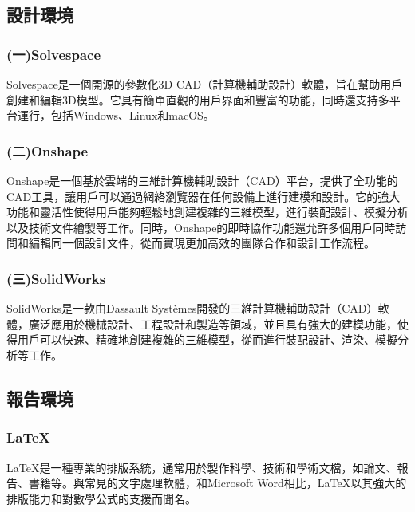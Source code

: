 \subsection{設計環境}
\subsubsection{(一)Solvespace}
\fontsize{14pt}{2.5pt}\sectionef\hspace{12pt}
Solvespace是一個開源的參數化3D CAD（計算機輔助設計）軟體，旨在幫助用戶創建和編輯3D模型。它具有簡單直觀的用戶界面和豐富的功能，同時還支持多平台運行，包括Windows、Linux和macOS。\\
\subsubsection{(二)Onshape}
\fontsize{14pt}{2.5pt}\sectionef\hspace{12pt}
Onshape是一個基於雲端的三維計算機輔助設計（CAD）平台，提供了全功能的CAD工具，讓用戶可以通過網絡瀏覽器在任何設備上進行建模和設計。它的強大功能和靈活性使得用戶能夠輕鬆地創建複雜的三維模型，進行裝配設計、模擬分析以及技術文件繪製等工作。同時，Onshape的即時協作功能還允許多個用戶同時訪問和編輯同一個設計文件，從而實現更加高效的團隊合作和設計工作流程。\\
\subsubsection{(三)SolidWorks}
\fontsize{14pt}{2.5pt}\sectionef\hspace{12pt}
SolidWorks是一款由Dassault Systèmes開發的三維計算機輔助設計（CAD）軟體，廣泛應用於機械設計、工程設計和製造等領域，並且具有強大的建模功能，使得用戶可以快速、精確地創建複雜的三維模型，從而進行裝配設計、渲染、模擬分析等工作。\\
\subsection{報告環境}
\fontsize{14pt}{2.5pt}\sectionef\hspace{12pt}
\subsubsection{LaTeX}
\fontsize{14pt}{2.5pt}\sectionef\hspace{12pt}
LaTeX是一種專業的排版系統，通常用於製作科學、技術和學術文檔，如論文、報告、書籍等。與常見的文字處理軟體，和Microsoft Word相比，LaTeX以其強大的排版能力和對數學公式的支援而聞名。

\newpage

\renewcommand{\baselinestretch}{0.5} %